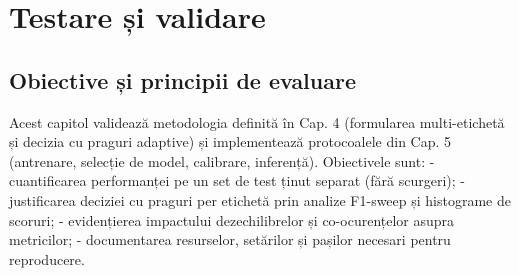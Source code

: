 \chapter{Testare și validare}
\label{ch:testare-validare}


\section{Obiective și principii de evaluare}
Acest capitol validează metodologia definită în Cap. 4 (formularea multi-etichet\u{a} și decizia cu praguri adaptive) și implementează protocoalele din Cap. 5 (antrenare, selecție de model, calibrare, inferență). Obiectivele sunt:
- cuantificarea performanței pe un set de test ținut separat (fără scurgeri);
- justificarea deciziei cu praguri per etichetă prin analize F1-sweep și histograme de scoruri;
- evidențierea impactului dezechilibrelor și co-ocurențelor asupra metricilor;
- documentarea resurselor, setărilor și pașilor necesari pentru reproducere.

